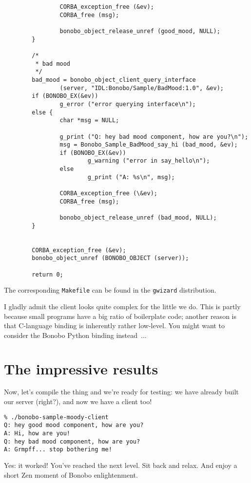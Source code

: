 \documentclass[final,10pt]{article}
\newcommand{\gwizard}{{\tt gwizard}}
\begin{document}
\begin{verbatim}
                CORBA_exception_free (&ev);
                CORBA_free (msg);
                
                bonobo_object_release_unref (good_mood, NULL); 
        }

        /* 
         * bad mood 
         */
        bad_mood = bonobo_object_client_query_interface 
                (server, "IDL:Bonobo/Sample/BadMood:1.0", &ev);
        if (BONOBO_EX(&ev))
                g_error ("error querying interface\n");
        else {
                char *msg = NULL;

                g_print ("Q: hey bad mood component, how are you?\n");
                msg = Bonobo_Sample_BadMood_say_hi (bad_mood, &ev);
                if (BONOBO_EX(&ev)) 
                        g_warning ("error in say_hello\n");
                else
                        g_print ("A: %s\n", msg);
                
                CORBA_exception_free (\&ev);
                CORBA_free (msg);
                
                bonobo_object_release_unref (bad_mood, NULL);       
        }
        
                        
        CORBA_exception_free (&ev);
        bonobo_object_unref (BONOBO_OBJECT (server));
        
        return 0;
\end{verbatim}   
The corresponding \verb|Makefile| can be found in the \gwizard{}
distribution. 

I gladly admit the client looks quite complex for the little we do. 
This is partly because small programs have a big ratio of boilerplate
code; another reason is that C-language binding is inherently rather
low-level. You might want to consider the Bonobo Python binding
instead~\cite{pythonbonobo}...

 \section{The impressive results}
Now, let's compile the thing and we're ready for testing:
we have already built our server (right?), and now we have a client too!
\begin{verbatim}
% ./bonobo-sample-moody-client 
Q: hey good mood component, how are you?
A: Hi, how are you!
Q: hey bad mood component, how are you?
A: Grmpff... stop bothering me!
\end{verbatim}
Yes: it worked! You've reached the next level. Sit back and relax. And
enjoy a short Zen moment of Bonobo enlightenment.
\end{document}
